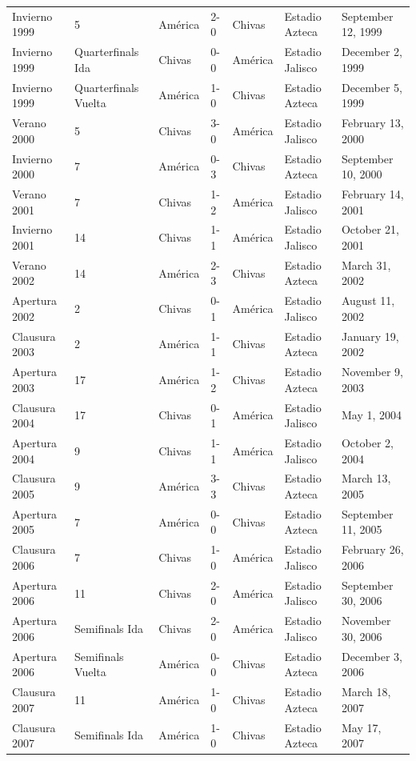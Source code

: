 \documentclass{article}
\begin{document}
\begin{tabular}{lllllll}
Invierno 1999 & 5 & América & 2-0 & Chivas & Estadio Azteca & September 12, 1999 \\
Invierno 1999 & Quarterfinals Ida & Chivas & 0-0 & América & Estadio Jalisco & December 2, 1999 \\
Invierno 1999 & Quarterfinals Vuelta & América & 1-0 & Chivas & Estadio Azteca & December 5, 1999 \\
Verano 2000 & 5 & Chivas & 3-0 & América & Estadio Jalisco & February 13, 2000 \\
Invierno 2000 & 7 & América & 0-3 & Chivas & Estadio Azteca & September 10, 2000 \\
Verano 2001 & 7 & Chivas & 1-2 & América & Estadio Jalisco & February 14, 2001 \\
Invierno 2001 & 14 & Chivas & 1-1 & América & Estadio Jalisco & October 21, 2001 \\
Verano 2002 & 14 & América & 2-3 & Chivas & Estadio Azteca & March 31, 2002 \\
Apertura 2002 & 2 & Chivas & 0-1 & América & Estadio Jalisco & August 11, 2002 \\
Clausura 2003 & 2 & América & 1-1 & Chivas & Estadio Azteca & January 19, 2002 \\
Apertura 2003 & 17 & América & 1-2 & Chivas & Estadio Azteca & November 9, 2003 \\
Clausura 2004 & 17 & Chivas & 0-1 & América & Estadio Jalisco & May 1, 2004 \\
Apertura 2004 & 9 & Chivas & 1-1 & América & Estadio Jalisco & October 2, 2004 \\
Clausura 2005 & 9 & América & 3-3 & Chivas & Estadio Azteca & March 13, 2005 \\
Apertura 2005 & 7 & América & 0-0 & Chivas & Estadio Azteca & September 11, 2005 \\
Clausura 2006 & 7 & Chivas & 1-0 & América & Estadio Jalisco & February 26, 2006 \\
Apertura 2006 & 11 & Chivas & 2-0 & América & Estadio Jalisco & September 30, 2006 \\
Apertura 2006 & Semifinals Ida & Chivas & 2-0 & América & Estadio Jalisco & November 30, 2006 \\
Apertura 2006 & Semifinals Vuelta & América & 0-0 & Chivas & Estadio Azteca & December 3, 2006 \\
Clausura 2007 & 11 & América & 1-0 & Chivas & Estadio Azteca & March 18, 2007 \\
Clausura 2007 & Semifinals Ida & América & 1-0 & Chivas & Estadio Azteca & May 17, 2007 \\

\end{tabular}
\end{document}
